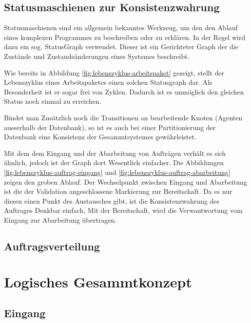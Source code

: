 

\subsection{Statusmaschienen zur Konsistenzwahrung}

\nocite{statechart}

Statusmaschienen sind ein allgemein bekanntes Werkzeug,
um den den Ablauf eines komplexen Programmes zu beschreiben oder zu erkl\"aren.
In der Regel wird dazu ein sog. StatusGraph verwendet.
Dieser ist ein Gerichteter Graph der die Zust\"ande und Zustands\"anderungen eines Systemes beschreibt.

Wie bereits in Abbildung \ref{fig:lebenszyklus-arbeitspaket} gezeigt,
stellt der Lebenszyklus eines Arbeitspaketes einen solchen Statusgraph dar.
Als Besonderheit ist er sogar frei von Zyklen.
Dadurch ist es unm\"oglich den gleichen Status noch einmal zu erreichen.

Bindet man Zus\"atzlich noch die Transitionen an bearbeitende Knoten (Agenten ausserhalb der Datenbank),
so ist es auch bei einer Partitionierung der Datenbank eine Konsistenz der Gesammtsystemes gew\"ahrleistet.



Mit dem dem Eingang und der Abarbeitung von Auftr\"agen verh\"alt es sich \"ahnlich,
jedoch ist der Graph dort Wesentlich einfacher.
Die Abbildungen \ref{fig:lebenszyklus-auftrag-eingang} und \ref{fig:lebenszyklus-auftrag-abarbeitung} zeigen den groben Ablauf.
Der Wechselpunkt zwischen Eingang und Abarbeitung ist die der Validation angeschlossene Markierung zur Bereitschaft.
Da es nur diesen einen Punkt des Austausches gibt, ist die Konsistenzwahrung des Auftrages Denkbar einfach,
Mit der Bereitschaft, wird die Verwantwortung vom Eingang zur Abarbeitung \"ubertragen.


\subsection{Auftragsverteilung}

\section{Logisches Gesammtkonzept}
\subsection{Eingang}

